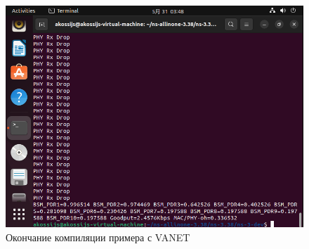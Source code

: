 \begin{figure}[!h]
  \centering
  \includegraphics[width=0.9\linewidth]{image/004.PNG}
  \caption{Окончание  компиляции примера с VANET}
  \label{fig:ns3:1.2}
\end{figure}